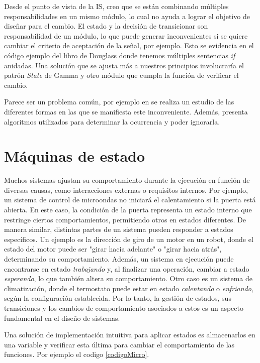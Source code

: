 Desde el punto de vista de la IS, creo que se están combinando múltiples responsabilidades en un mismo módulo, lo cual no ayuda a lograr el objetivo de diseñar para el cambio. El estado y la decisión de transicionar son responsabilidad de un módulo, lo que puede generar inconvenientes si se quiere cambiar el criterio de aceptación de la señal, por ejemplo. Esto se evidencia en el código ejemplo del libro de Douglass donde tenemos múltiples sentencias \textit{if} anidadas. Una solución que se ajusta más a nuestros principios involucraría el patrón \textit{State} de Gamma y otro módulo que cumpla la función de verificar el cambio.

Parece ser un problema común, por ejemplo en \cite{ganssleDebouncing} se realiza un estudio de las diferentes formas en las que se manifiesta este inconveniente. Además, presenta algoritmos utilizados para determinar la ocurrencia y poder ignorarla.

\section{Máquinas de estado}\label{cap:state}


Muchos sistemas ajustan su comportamiento durante la ejecución en función de diversas causas, como interacciones externas o requisitos internos. Por ejemplo, un sistema de control de microondas no iniciará el calentamiento si la puerta está abierta. En este caso, la condición de la puerta representa un estado interno que restringe ciertos comportamientos, permitiendo otros en estados diferentes. De manera similar, distintas partes de un sistema pueden responder a estados específicos. Un ejemplo es la dirección de giro de un motor en un robot, donde el estado del motor puede ser "girar hacia adelante" o "girar hacia atrás", determinando su comportamiento. Además, un sistema en ejecución puede encontrarse en estado \textit{trabajando} y, al finalizar una operación, cambiar a estado \textit{esperando}, lo que también altera su comportamiento. Otro caso es un sistema de climatización, donde el termostato puede estar en estado \textit{calentando} o \textit{enfriando}, según la configuración establecida. Por lo tanto, la gestión de estados, sus transiciones y los cambios de comportamiento asociados a estos es un aspecto fundamental en el diseño de sistemas.

Una solución de implementación intuitiva para aplicar estados es almacenarlos en una variable y verificar esta última para cambiar el comportamiento de las funciones. Por ejemplo el codigo \ref{codigoMicro}.

